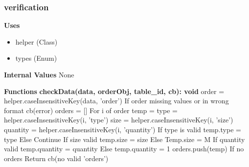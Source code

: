 \documentclass [10pt]{article}
\begin{document}
\subsubsection{verification}
\textbf{Uses}
\begin{itemize}
	\item helper (Class)
	\item types (Enum)
\end{itemize}

\textbf{Internal Values}
None

\textbf{Functions}
\textbf{checkData(data, orderObj, table\_id, cb): void} \newline
order = helper.caseInsensitiveKey(data, 'order') \newline
If order missing values or in wrong format  \newline
	cb(error) \newline
\newline
orders = [] \newline
\newline
For i of order \newline
	temp = {} \newline
	type = helper.caseInsensitiveKey(i, 'type') \newline
	size = helper.caseInsensitiveKey(i, 'size') \newline
	quantity =  helper.caseInsensitiveKey(i, 'quantity') \newline
	If type is valid \newline
		temp.type = type \newline
	Else \newline
		Continue \newline
	 \newline
	If size valid \newline
		temp.size = size \newline
	Else \newline
		Temp.size = M \newline
	If quantity valid \newline
		temp.quantity  = quantity \newline
	Else \newline
		temp.quantity  = 1 \newline
	\newline
	orders.push(temp) \newline
\newline
If no orders \newline
	Return cb(no valid 'orders') \newline
\end{document}
